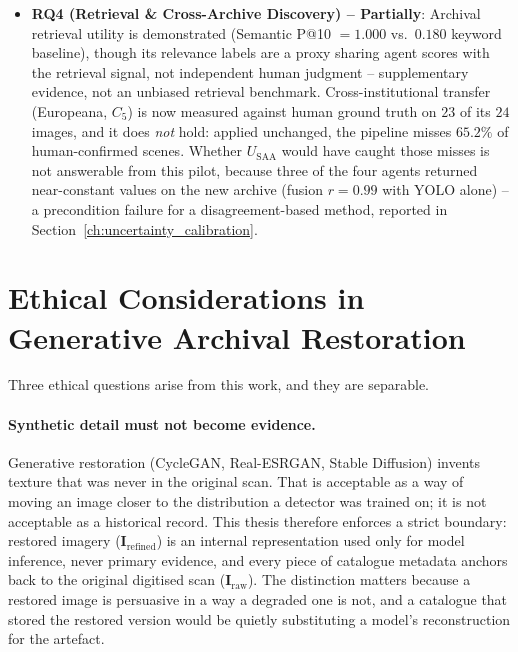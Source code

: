 \documentclass[12pt,a4paper]{report}
\begin{document}
\begin{itemize}
    \item \textbf{RQ4 (Retrieval \& Cross-Archive Discovery) -- Partially}: Archival retrieval utility is demonstrated (Semantic P@10 $=1.000$ vs.\ $0.180$ keyword baseline), though its relevance labels are a proxy sharing agent scores with the retrieval signal, not independent human judgment -- supplementary evidence, not an unbiased retrieval benchmark. Cross-institutional transfer (Europeana, $C_5$) is now measured against human ground truth on $23$ of its $24$ images, and it does \emph{not} hold: applied unchanged, the pipeline misses $65.2\%$ of human-confirmed scenes. Whether $U_{\text{SAA}}$ would have caught those misses is not answerable from this pilot, because three of the four agents returned near-constant values on the new archive (fusion $r=0.99$ with YOLO alone) -- a precondition failure for a disagreement-based method, reported in Section~\ref{ch:uncertainty_calibration}.
\end{itemize}

\section{Ethical Considerations in Generative Archival Restoration}
Three ethical questions arise from this work, and they are separable.

\paragraph{Synthetic detail must not become evidence.} Generative restoration (CycleGAN, Real-ESRGAN, Stable Diffusion) invents texture that was never in the original scan. That is acceptable as a way of moving an image closer to the distribution a detector was trained on; it is not acceptable as a historical record. This thesis therefore enforces a strict boundary: restored imagery ($\mathbf{I}_{\text{refined}}$) is an internal representation used only for model inference, never primary evidence, and every piece of catalogue metadata anchors back to the original digitised scan ($\mathbf{I}_{\text{raw}}$). The distinction matters because a restored image is persuasive in a way a degraded one is not, and a catalogue that stored the restored version would be quietly substituting a model's reconstruction for the artefact.
\end{document}
